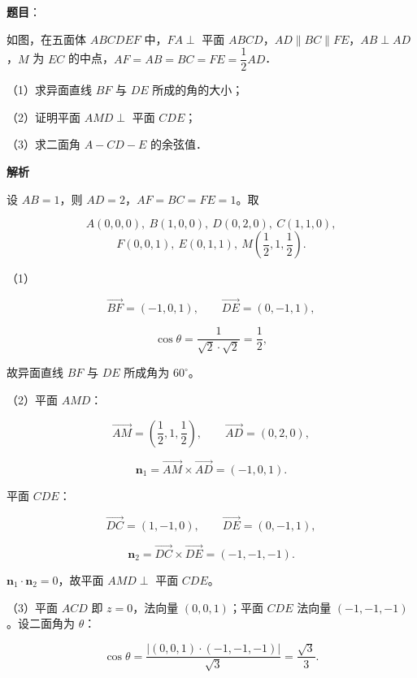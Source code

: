 \begin{answer}

\textbf{题目}：

如图，在五面体 $ABCDEF$ 中，$FA\perp$ 平面 $ABCD$，$AD\parallel BC\parallel FE$，$AB\perp AD$，$M$ 为 $EC$ 的中点，$AF=AB=BC=FE=\dfrac12AD$．
\nopagebreak[4]
\begin{center}\end{center}
\nopagebreak[4]
（1）求异面直线 $BF$ 与 $DE$ 所成的角的大小；

（2）证明平面 $AMD\perp$ 平面 $CDE$；

（3）求二面角 $A-CD-E$ 的余弦值．

\textbf{解析}

设 $AB=1$，则 $AD=2$，$AF=BC=FE=1$。取

\nopagebreak[4]
\[A(0,0,0),\ B(1,0,0),\ D(0,2,0),\ C(1,1,0),\]
\nopagebreak[4]
\[F(0,0,1),\ E(0,1,1),\ M\left(\frac12,1,\frac12\right).\]

（1）

\nopagebreak[4]
\[\overrightarrow{BF}=(-1,0,1),\qquad \overrightarrow{DE}=(0,-1,1),\]

\nopagebreak[4]
\[\cos\theta=\frac{1}{\sqrt2\cdot\sqrt2}=\frac12,\]

故异面直线 $BF$ 与 $DE$ 所成角为 $60^\circ$。

（2）平面 $AMD$：

\nopagebreak[4]
\[\overrightarrow{AM}=\left(\frac12,1,\frac12\right),\qquad
\overrightarrow{AD}=(0,2,0),\]

\nopagebreak[4]
\[\mathbf n_1=\overrightarrow{AM}\times\overrightarrow{AD}=(-1,0,1).\]

平面 $CDE$：

\nopagebreak[4]
\[\overrightarrow{DC}=(1,-1,0),\qquad \overrightarrow{DE}=(0,-1,1),\]

\nopagebreak[4]
\[\mathbf n_2=\overrightarrow{DC}\times\overrightarrow{DE}=(-1,-1,-1).\]

$\mathbf n_1\cdot\mathbf n_2=0$，故平面 $AMD\perp$ 平面 $CDE$。

（3）平面 $ACD$ 即 $z=0$，法向量 $(0,0,1)$；平面 $CDE$ 法向量 $(-1,-1,-1)$。设二面角为 $\theta$：

\nopagebreak[4]
\[\cos\theta=\frac{|(0,0,1)\cdot(-1,-1,-1)|}{\sqrt3}
=\frac{\sqrt3}{3} .\]


\end{answer}

